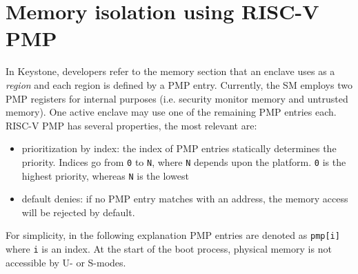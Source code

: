 \section{Memory isolation using RISC-V PMP}
In Keystone, developers refer to the memory section that an enclave uses as a \textit{region} and each region is defined by a PMP entry. Currently, the SM employs two PMP registers for internal purposes (i.e. security monitor memory and untrusted memory). One active enclave may use one of the remaining PMP entries each. RISC-V PMP has several properties, the most relevant are: 
\begin{itemize}
    \item prioritization by index: the index of PMP entries statically determines the priority. Indices go from \texttt{0} to \texttt{N}, where \texttt{N} depends upon the platform. \texttt{0} is the highest priority, whereas \texttt{N} is the lowest 
    \item default denies: if no PMP entry matches with an address, the memory access will be rejected by default.
\end{itemize}
For simplicity, in the following explanation PMP entries are denoted as \texttt{pmp[i]} where \texttt{i} is an index. At the start of the boot process, physical memory is not accessible by U- or S-modes.

